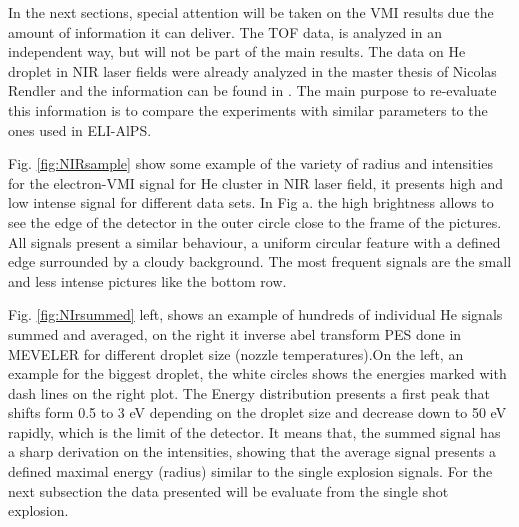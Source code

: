 In the next sections, special attention will be taken on the VMI results due the amount of information it can deliver. The TOF data, is analyzed in an independent way, but will not be part of the main results. The data on He droplet in NIR laser fields were already analyzed in the master thesis of Nicolas Rendler and the information can be found in \cite{rendler_einzelschuss_2017}. The main purpose to re-evaluate this information is to compare the experiments with similar parameters to the ones used in ELI-AlPS.

Fig. \ref{fig:NIRsample} show some example of the variety of radius and intensities for the  electron-VMI signal for He cluster in NIR laser field, it presents high and low intense signal for different data sets. In Fig a. the high brightness allows to see the edge of the detector in the outer circle close to the frame of the pictures. All signals present a similar behaviour, a uniform circular feature with a defined edge surrounded by a cloudy background. The most frequent signals are the small and less intense pictures like the bottom row. 

Fig. \ref{fig:NIrsummed} left, shows an example of hundreds of individual He signals summed and averaged, on the right it inverse abel transform PES done in MEVELER \cite{dick_inverting_2013} for different droplet size (nozzle temperatures).On the left, an example for the biggest droplet, the white circles shows the energies marked with dash lines on the right plot.  The Energy distribution presents a first peak that shifts form 0.5 to 3 eV  depending on the droplet size and decrease down to 50 eV rapidly, which is the limit of the detector. It means that, the summed signal has a sharp derivation on the intensities, showing that the average signal presents a defined maximal energy (radius) similar to the single explosion signals. For the next subsection the data presented will be evaluate from the single shot explosion.

